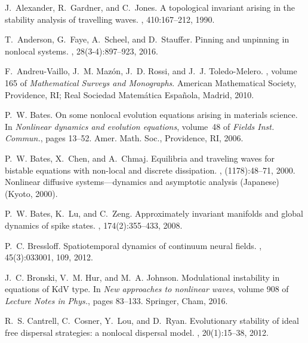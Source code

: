 \documentclass[10pt]{article}
\begin{document}
\begin{thebibliography}{10}

J.~Alexander, R.~Gardner, and C.~Jones.
\newblock A topological invariant arising in the stability analysis of
  travelling waves.
, 410:167--212, 1990.

T.~Anderson, G.~Faye, A.~Scheel, and D.~Stauffer.
\newblock Pinning and unpinning in nonlocal systems.
, 28(3-4):897--923, 2016.

F.~Andreu-Vaillo, J.~M. Maz\'on, J.~D. Rossi, and J.~J. Toledo-Melero.
, volume 165 of {\em Mathematical
  Surveys and Monographs}.
\newblock American Mathematical Society, Providence, RI; Real Sociedad
  Matem\'atica Espa\~nola, Madrid, 2010.

P.~W. Bates.
\newblock On some nonlocal evolution equations arising in materials science.
\newblock In {\em Nonlinear dynamics and evolution equations}, volume~48 of
  {\em Fields Inst. Commun.}, pages 13--52. Amer. Math. Soc., Providence, RI,
  2006.

P.~W. Bates, X.~Chen, and A.~Chmaj.
\newblock Equilibria and traveling waves for bistable equations with non-local
  and discrete dissipation.
, (1178):48--71, 2000.
\newblock Nonlinear diffusive systems---dynamics and asymptotic analysis
  (Japanese) (Kyoto, 2000).

P.~W. Bates, K.~Lu, and C.~Zeng.
\newblock Approximately invariant manifolds and global dynamics of spike
  states.
, 174(2):355--433, 2008.

P.~C. Bressloff.
\newblock Spatiotemporal dynamics of continuum neural fields.
, 45(3):033001, 109, 2012.

J.~C. Bronski, V.~M. Hur, and M.~A. Johnson.
\newblock Modulational instability in equations of {K}d{V} type.
\newblock In {\em New approaches to nonlinear waves}, volume 908 of {\em
  Lecture Notes in Phys.}, pages 83--133. Springer, Cham, 2016.

R.~S. Cantrell, C.~Cosner, Y.~Lou, and D.~Ryan.
\newblock Evolutionary stability of ideal free dispersal strategies: a nonlocal
  dispersal model.
, 20(1):15--38, 2012.


\end{thebibliography}
\end{document}
